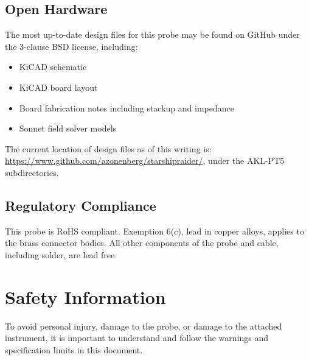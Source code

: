 \documentclass[11pt]{article}
\begin{document}
\subsection{Open Hardware}

The most up-to-date design files for this probe may be found on GitHub under the 3-clause BSD license, including:

\begin{itemize}
\item KiCAD schematic
\item KiCAD board layout
\item Board fabrication notes including stackup and impedance
\item Sonnet field solver models
\end{itemize}

The current location of design files as of this writing is:
\url{https://www.github.com/azonenberg/starshipraider/}, under the AKL-PT5 subdirectories.

\subsection{Regulatory Compliance}

This probe is RoHS compliant. Exemption 6(c), lead in copper alloys, applies to the brass connector bodies. All other
components of the probe and cable, including solder, are lead free.

\pagebreak
\section{Safety Information}

To avoid personal injury, damage to the probe, or damage to the attached instrument, it is important to understand and
follow the warnings and specification limits in this document.
\end{document}
